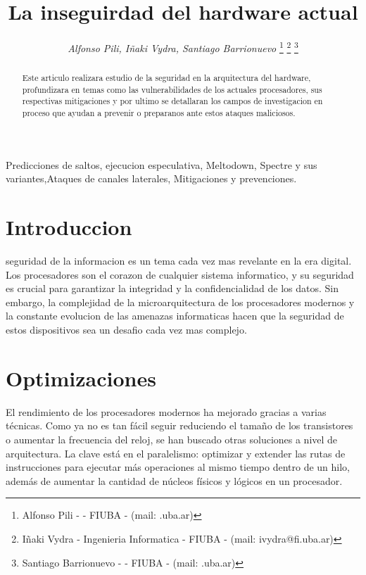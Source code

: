 \documentclass[lettersize,compsoc]{IEEEtran}
\begin{document}
\title{La inseguirdad del hardware actual}  %
\author{
\textit{Alfonso Pili, Iñaki Vydra, Santiago Barrionuevo}
\thanks{Alfonso Pili -  - FIUBA - (mail: .uba.ar)}
\thanks{Iñaki Vydra - Ingenieria Informatica - FIUBA - (mail: ivydra@fi.uba.ar)}
\thanks{Santiago Barrionuevo - - FIUBA - (mail: .uba.ar)}
}


\maketitle

\begin{abstract} %
Este articulo realizara estudio de la seguridad en la arquitectura del hardware, profundizara en temas como las vulnerabilidades de los actuales procesadores, sus respectivas mitigaciones y por ultimo se detallaran los campos de investigacion en proceso que ayudan a prevenir o preparanos ante estos ataques maliciosos.
\end{abstract}

\begin{IEEEkeywords} %
Predicciones de saltos, ejecucion especulativa, Meltodown, Spectre y sus variantes,Ataques de canales laterales, Mitigaciones y prevenciones.
\end{IEEEkeywords}


\section{Introduccion}
 seguridad de la informacion es un tema cada vez mas revelante en la era digital. Los procesadores son el corazon de cualquier sistema informatico, y su seguridad es crucial para garantizar la integridad y la confidencialidad de los datos. Sin embargo, la complejidad de la microarquitectura de los procesadores modernos y la constante evolucion de las amenazas informaticas hacen que la seguridad de estos dispositivos sea un desafio cada vez mas complejo. 

\section{Optimizaciones}

El rendimiento de los procesadores modernos ha mejorado gracias a varias técnicas. Como ya no es tan fácil seguir reduciendo el tamaño de los transistores o aumentar la frecuencia del reloj, se han buscado otras soluciones a nivel de arquitectura. La clave está en el paralelismo: optimizar y extender las rutas de instrucciones para ejecutar más operaciones al mismo tiempo dentro de un hilo, además de aumentar la cantidad de núcleos físicos y lógicos en un procesador.
\end{document}
